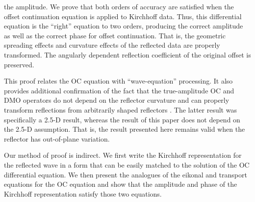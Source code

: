 the amplitude.  We prove that both orders of accuracy are satisfied
when the offset continuation equation is applied to Kirchhoff data.
Thus, this differential equation is the ``right'' equation to two
orders, producing the correct amplitude as well as the correct phase
for offset continuation.  That is, the geometric spreading effects and
curvature effects of the reflected data are properly transformed.  The
angularly dependent reflection coefficient of the original offset is
preserved.  \par This proof relates the OC equation with
``wave-equation'' processing.  It also provides additional
confirmation of the fact that the true-amplitude OC and DMO operators
\cite[]{GEO58-01-00470066,joint,santos,GEO63-02-05570573} do not
depend on the reflector curvature and can properly transform
reflections from arbitrarily shaped reflectors
\cite[]{Goldin.sep.67.171,GEO61-03-07590775,cwp}.  The latter result
was specifically a 2.5-D result, whereas the result of this paper does
not depend on the 2.5-D assumption.  That is, the result presented
here remains valid when the reflector has out-of-plane variation.
\par Our method of proof is indirect.  We first write the Kirchhoff
representation for the reflected wave in a form that can be easily
matched to the solution of the OC differential equation.  We then
present the analogues of the eikonal and transport equations for the
OC equation and show that the amplitude and phase of the Kirchhoff
representation satisfy those two equations.

